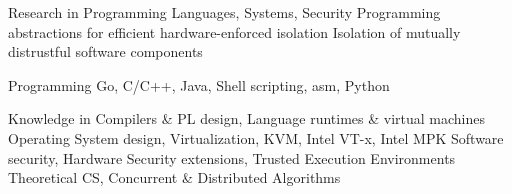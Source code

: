 


\begin{cvskills}


\cvskill
{Research in}
{Programming Languages, Systems, Security\linebreak
  Programming abstractions for efficient hardware-enforced isolation\linebreak
  Isolation of mutually distrustful software components\linebreak}

\cvskill
{Programming} %
{Go, C/C++, Java, Shell scripting, asm, Python\linebreak} %


\cvskill
{Knowledge in} %
{Compilers \& PL design, Language runtimes \& virtual machines\linebreak
 Operating System design, Virtualization, KVM, Intel VT-x, Intel MPK\linebreak
 Software security, Hardware Security extensions, Trusted Execution Environments\linebreak
  Theoretical CS, Concurrent \& Distributed Algorithms} %

\end{cvskills}
